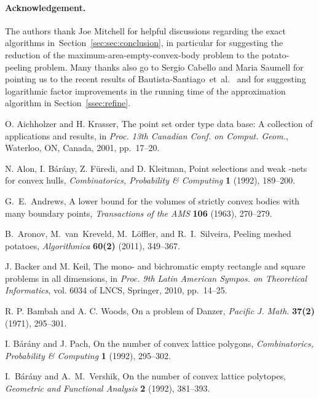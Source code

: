 \documentclass[11pt]{article}
\def\etal{{et~al.}}
\newcommand{\secref}[1]{Section~\ref{sec:#1}}
\begin{document}
\paragraph{Acknowledgement.}
The authors thank Joe Mitchell for helpful discussions regarding the
exact algorithms in~\secref{sec:conclusion}, in particular for
suggesting the reduction of the maximum-area-empty-convex-body problem
to the potato-peeling problem. Many thanks also go to Sergio Cabello
and Maria Saumell for pointing us to the recent results of
Bautista-Santiago~\etal~\cite{BDL+11} and for suggesting logarithmic factor
improvements in the running time of the approximation algorithm in
Section~\ref{ssec:refine}.


\begin{thebibliography}{99}

O. Aichholzer and H. Krasser,
The point set order type data base: A collection of applications and results,
in \emph{Proc. 13th Canadian Conf. on Comput. Geom.},
Waterloo, ON, Canada, 2001, pp.~17--20.

N. Alon, I. B\'ar\'any, Z. F\"uredi, and D. Kleitman,
Point selections and weak -nets for convex hulls,
\emph{Combinatorics, Probability \& Computing} \textbf{1} (1992), 189--200.

G.~E.~Andrews,
A lower bound for the volumes of strictly convex bodies with many boundary points,
\emph{Transactions of the AMS} \textbf{106} (1963), 270--279.

B.~Aronov, M.~van~Kreveld, M.~L\"offler, and R.~I.~Silveira,
Peeling meshed potatoes, \emph{Algorithmica} \textbf{60(2)} (2011), 349--367.

J. Backer and M. Keil,
The mono- and bichromatic empty rectangle and square problems in all dimensions,
in \emph{Proc. 9th Latin American Sympos. on Theoretical Informatics},
vol. 6034 of LNCS, Springer, 2010, pp.~14--25.

R. P. Bambah and A. C. Woods,
On a problem of Danzer,
\emph{Pacific J. Math.} \textbf{37(2)} (1971), 295--301.

I. B\'ar\'any and J. Pach,
On the number of convex lattice polygons,
\emph{Combinatorics, Probability \& Computing} \textbf{1} (1992), 295--302.

I.~B\'ar\'any and A.~M.~Vershik,
On the number of convex lattice polytopes,
\emph{Geometric and Functional Analysis} \textbf{2} (1992), 381--393.


\end{thebibliography}
\end{document}
